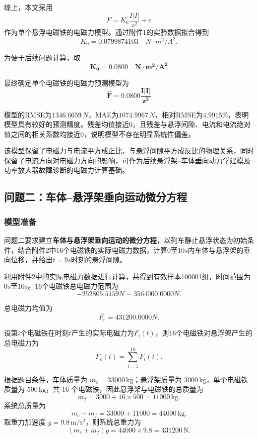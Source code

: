 \documentclass[a4paper]{nmmcm}
\begin{document}
综上，本文采用
\begin{equation}
F=K_0\frac{I|I|}{z^2}+\varepsilon
\end{equation}
作为单个悬浮电磁铁的电磁力模型。通过附件1的实验数据拟合得到
\[
K_0=0.0799874103\quad N\cdot m^2/A^2.
\]

为便于后续问题计算，取
\[
\bm{K_0=0.0800\quad N\cdot m^2/A^2}
\]

最终确定单个电磁铁的电磁力预测模型为
\[
\bm{\hat{F}=0.0800\frac{I|I|}{z^2}}
\]

模型的RMSE为$1346.6659\,N$，MAE为$1074.9967\,N$，相对RMSE为$4.9915\%$，表明模型具有较好的预测精度。残差均值接近0，且残差与悬浮间隙、电流和电流绝对值之间的相关系数均接近0，说明模型不存在明显系统性偏差。

该模型保留了电磁力与电流平方成正比、与悬浮间隙平方成反比的物理关系，同时保留了电流方向对电磁力方向的影响，可作为后续悬浮架--车体垂向动力学建模及功率放大器故障诊断的电磁力计算基础。

\subsection{问题二：车体--悬浮架垂向运动微分方程}

\subsubsection{模型准备}

问题二要求建立\textbf{车体与悬浮架垂向运动的微分方程}，以列车静止悬浮状态为初始条件，结合附件2中16个电磁铁的实际电磁力数据，计算$0$至$10s$内车体与悬浮架的垂向位移，并给出$t=9s$时刻的悬浮间隙。

利用附件2中的实际电磁力数据进行计算，共得到有效样本100001组，时间范围为$0s$至$10s$。16个电磁铁总电磁力范围为
\[
-252805.5159N \sim 3564000.0000N.
\]

总电磁力均值为
\[
\overline{F_e}=431200.0000N.
\]

设第$i$个电磁铁在时刻$t$产生的实际电磁力为$F_i(t)$，则16个电磁铁对悬浮架产生的总电磁力为
\begin{equation}
F_e(t)=\sum_{i=1}^{16}F_i(t).
\end{equation}

根据题目条件，车体质量为 $m_c=33000\,\mathrm{kg}$；悬浮架质量为 $3000\,\mathrm{kg}$，单个电磁铁质量为 $500\,\mathrm{kg}$，共 $16$ 个电磁铁，因此悬浮架与电磁铁的总质量为
\[
m_f=3000+16\times 500=11000\,\mathrm{kg}.
\]
系统总质量为
\[
m_c+m_f=33000+11000=44000\,\mathrm{kg}.
\]
取重力加速度 $g=9.8\,\mathrm{m/s^2}$，则系统总重力为
\[
(m_c+m_f)g=44000\times 9.8=431200\,\mathrm{N}.
\]
\end{document}

